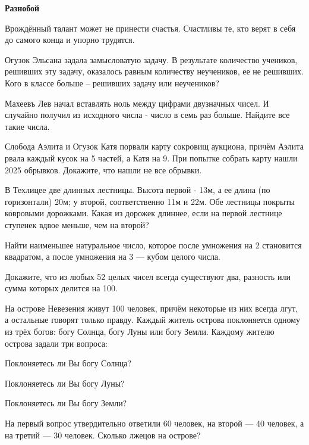 \centerline{\bf \Huge Разнобой}

\begin{flushright}
        \scriptsize{Врождённый талант может не принести счастья. Счастливы те, кто верят в себя до самого конца и упорно трудятся.}
\end{flushright}

 Огузок Эльсана задала замысловатую задачу. В результате количество учеников, решивших эту задачу, оказалось равным количеству неучеников, ее не решивших. Кого в классе больше – решивших задачу или неучеников?

 Махеевъ Лев начал вставлять ноль между цифрами двузначных чисел. И случайно получил из исходного числа - число в семь раз больше. Найдите все такие числа.

 Слобода Аэлита и Огузок Катя порвали карту сокровищ аукциона, причём Аэлита рвала каждый кусок на 5 частей, а Катя на 9. При попытке собрать карту нашли 2025 обрывков. Докажите, что нашли не все обрывки.

 В Техлицее две длинных лестницы. Высота первой - 13м, а ее длина (по горизонтали) 20м; у второй, соответственно 11м и 22м. Обе лестницы покрыты ковровыми дорожками. Какая из дорожек длиннее, если на первой лестнице ступенек вдвое меньше, чем на второй?

 Найти наименьшее натуральное число, которое после умножения на 2 становится квадратом, а после умножения на 3 — кубом целого числа.

 Докажите, что из любых 52 целых чисел всегда существуют два, разность или сумма которых делится на 100.

 На острове Невезения живут 100 человек, причём некоторые из них всегда лгут, а остальные говорят только правду. Каждый житель острова поклоняется одному из трёх богов: богу Солнца, богу Луны или богу Земли. Каждому жителю острова задали три вопроса:

Поклоняетесь ли Вы богу Солнца?

Поклоняетесь ли Вы богу Луны?

Поклоняетесь ли Вы богу Земли?

На первый вопрос утвердительно ответили 60 человек, на второй — 40 человек, а на третий — 30 человек. Сколько лжецов на острове?